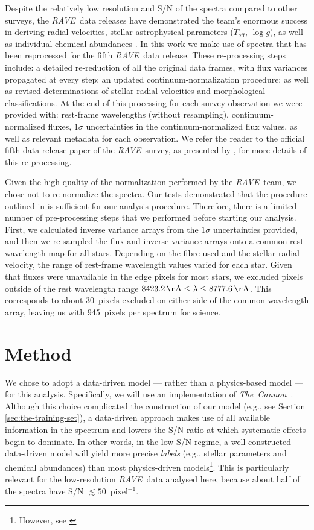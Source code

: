 \documentclass[preprint,trackchanges]{aastex}
\newcommand{\acronym}[1]{{\small{#1}}}
\newcommand{\project}[1]{\textsl{#1}}
\newcommand{\thecannon}{\project{The~Cannon}}
\newcommand{\rave}{\project{\acronym{RAVE}}}
\newcommand{\teff}{T_{\mathrm{eff}}}
\newcommand{\logg}{\log g}
\begin{document}
Despite the relatively low resolution and S/N of the spectra compared to other
surveys, the \rave\ data releases have demonstrated the team's enormous success 
in deriving radial velocities, stellar astrophysical parameters ($\teff$, $\logg$),
as well as individual chemical abundances \citep{Steinmetz_2006,Zwitter_2008,
Siebert_2011,Kordopatis_2013,Kunder_2016}.  In this work we make use of spectra
that has been reprocessed for the fifth \rave\ data release.  These re-processing
steps include: a detailed re-reduction of all the original data frames, with flux
variances propagated at every step; an updated continuum-normalization procedure;
as well as revised determinations of stellar radial velocities and morphological
classifications. At the end of this processing for each survey observation we were 
provided with: rest-frame wavelengths (without resampling), continuum-normalized 
fluxes, $1\sigma$ uncertainties in the continuum-normalized flux values, as well 
as relevant metadata for each observation.  We refer the reader to the official 
fifth data release paper of the \rave\ survey, as presented by \citet{Kunder_2016}, 
for more details of this re-processing.


Given the high-quality of the normalization performed by the \rave\ team, we chose
not to re-normalize the spectra.  Our tests demonstrated that the procedure 
outlined in \citet{Kunder_2016} is sufficient for our analysis procedure. Therefore,
there is a limited number of pre-processing steps that we performed before starting
our analysis.  First, we calculated inverse variance arrays from the $1\sigma$ 
uncertainties provided, and then we re-sampled the flux and inverse variance
arrays onto a common rest-wavelength map for all stars.  Depending on the fibre 
used and the stellar radial velocity, the range of rest-frame wavelength values
varied for each star.  Given that fluxes were unavailable in the edge pixels for 
most stars, we excluded pixels outside of the rest wavelength range 
$8423.2\,{\rm \AA} \le \lambda \le 8777.6\,{\rm \AA}$.  This corresponds to about
30~pixels excluded on either side of the common wavelength array, leaving us with
945~pixels per spectrum for science.  


\section{Method}
\label{sec:method}


We chose to adopt a data-driven model --- rather than a physics-based model ---
for this analysis.  Specifically, we will use an implementation of \thecannon\
\citep{Ness_2015,Ness_2016}.  Although this choice complicated the construction 
of our model (e.g., see Section \ref{sec:the-training-set}), a data-driven approach 
makes use of all available information in the spectrum and lowers the S/N ratio 
at which systematic effects begin to dominate.  In other words, in the low S/N
regime, a well-constructed data-driven model will yield more precise \emph{labels}
(e.g., stellar parameters and chemical abundances) than most physics-driven 
models\footnote{However, see \citet{Casey_2016a}}.  This is particularly relevant 
for the low-resolution \rave\ data analysed here, because about half of the 
spectra have S/N $\lesssim 50$~pixel$^{-1}$.
\end{document}
